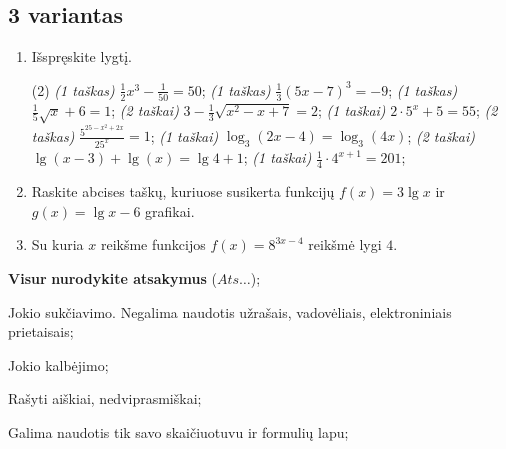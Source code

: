 \documentclass[a4paper]{article}
\begin{document}
\vspace*{12mm}

\subsection*{3 variantas}

\begin{enumerate}
      \item Išspręskite lygtį.
            \begin{tasks}[item-format={\normalfont}, after-item-skip=2mm](2)
                  \task \textit{(1 taškas)} $\frac{1}{2}x^3-\frac{1}{50}=50$;
                  \task \textit{(1 taškas)} $\frac{1}{3}(5x-7)^3=-9$;
                  \task \textit{(1 taškas)} $\frac{1}{5}\sqrt{x}+6=1$;
                  \task \textit{(2 taškai)} $3-\frac{1}{3}\sqrt{x^2-x+7}=2$;
                  \task \textit{(1 taškai)} $2\cdot5^x+5=55$;
                  \task \textit{(2 taškas)} $\frac{5^{25-x^2+2x}}{25^x}=1$;
                  \task \textit{(1 taškai)} $\log_3(2x-4)=\log_3(4x)$;
                  \task \textit{(2 taškai)} $\lg(x-3)+\lg(x)=\lg4+1$;
                  \task \textit{(1 taškai)} $\frac{1}{4}\cdot 4^{x+1}=201$;
            \end{tasks}

      \item Raskite abcises taškų, kuriuose susikerta funkcijų $f(x)=3\lg{x}$ ir $g(x)=\lg{x}-6$ grafikai.
      \item Su kuria $x$ reikšme funkcijos $f(x)=8^{3x-4}$ reikšmė lygi $4$.
\end{enumerate}

\begin{small}
      \begin{enumerate*}[label={(\arabic*)}]
            \item \textbf{Visur} \textbf{nurodykite atsakymus} ($Ats\ldots$);
            \item Jokio sukčiavimo. Negalima naudotis užrašais, vadovėliais,
            elektroniniais prietaisais;
            \item Jokio kalbėjimo;
            \item Rašyti aiškiai, nedviprasmiškai;
            \item Galima naudotis tik savo skaičiuotuvu ir formulių lapu;
      \end{enumerate*}
\end{small}

\vspace*{12mm}
\end{document}
